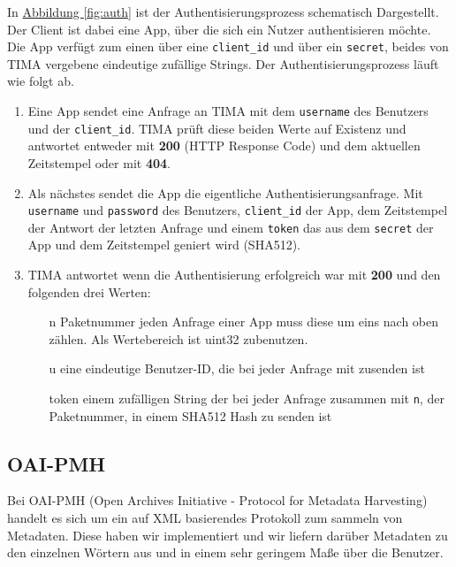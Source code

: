 In \hyperref[fig:auth]{Abbildung \ref*{fig:auth}} ist der Authentisierungsprozess schematisch Dargestellt. Der Client ist dabei eine App, über die sich ein Nutzer authentisieren möchte. Die App verfügt zum einen über eine \texttt{client\_id} und über ein \texttt{secret}, beides von TIMA vergebene eindeutige zufällige Strings. Der Authentisierungsprozess läuft wie folgt ab.
\begin{enumerate}
	\item Eine App sendet eine Anfrage an TIMA mit dem \texttt{username} des Benutzers und der \texttt{client\_id}. TIMA prüft diese beiden Werte auf Existenz und antwortet entweder mit \textbf{200} (HTTP Response Code) und dem aktuellen Zeitstempel oder mit \textbf{404}.
	\item Als nächstes sendet die App die eigentliche Authentisierungsanfrage. Mit \texttt{username} und \texttt{password} des Benutzers, \texttt{client\_id} der App, dem Zeitstempel der Antwort der letzten Anfrage und einem \texttt{token} das aus dem \texttt{secret} der App und dem Zeitstempel geniert wird (SHA512).
	\item TIMA antwortet wenn die Authentisierung erfolgreich war mit \textbf{200} und den folgenden drei Werten:
	\begin{itemize}
		\item[n] Paketnummer jeden Anfrage einer App muss diese um eins nach oben zählen. Als Wertebereich ist uint32 zubenutzen.
		\item[u] eine eindeutige Benutzer-ID, die bei jeder Anfrage mit zusenden ist
		\item[token] einem zufälligen String der bei jeder Anfrage zusammen mit \texttt{n}, der Paketnummer, in einem SHA512 Hash zu senden ist
	\end{itemize}
\end{enumerate}

\subsection{OAI-PMH}
Bei OAI-PMH (Open Archives Initiative - Protocol for Metadata Harvesting)
handelt es sich um ein auf XML basierendes Protokoll zum sammeln von Metadaten.
Diese haben wir implementiert und wir liefern darüber Metadaten zu den
einzelnen Wörtern aus und in einem sehr geringem Maße über die Benutzer.
